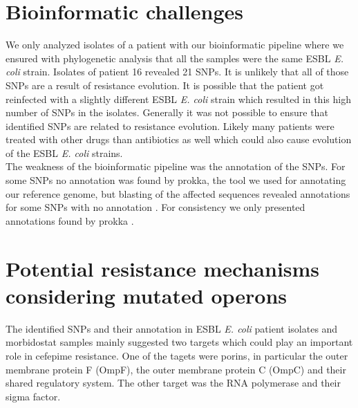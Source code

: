 \section{Bioinformatic challenges}
We only analyzed isolates of a patient with our bioinformatic pipeline where we ensured with phylogenetic analysis that all the samples were the same ESBL \textit{E. coli} strain. Isolates of patient 16 revealed 21 SNPs. It is unlikely that all of those SNPs are a result of resistance evolution. It is possible that the patient got reinfected with a slightly different ESBL \textit{E. coli} strain which resulted in this high number of SNPs in the isolates. Generally it was not possible to ensure that identified SNPs are related to resistance evolution. Likely many patients were treated with other drugs than antibiotics as well which could also cause evolution of the ESBL \textit{E. coli} strains. \\
The weakness of the bioinformatic pipeline was the annotation of the SNPs. For some SNPs no annotation was found by prokka, the tool we used for annotating our reference genome, but blasting of the affected sequences revealed annotations for some SNPs with no annotation \cite{seemann_prokka:_2014}.
For consistency we only presented annotations found by prokka \cite{seemann_prokka:_2014}. 

\section{Potential resistance mechanisms considering mutated operons}
The identified SNPs and their annotation in ESBL \textit{E. coli} patient isolates and morbidostat samples mainly suggested two targets which could play an important role in cefepime resistance. One of the tagets were porins, in particular the outer membrane protein F (OmpF), the outer membrane protein C (OmpC)  and their shared regulatory system. The other target was the RNA polymerase and their sigma factor. 
